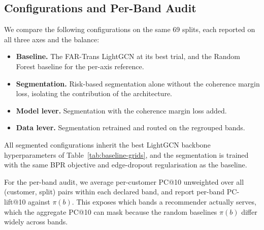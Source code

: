 \subsection{Configurations and Per-Band Audit}
\label{sec:exp:ablation}
We compare the following configurations on the same 69 splits, each reported on all three axes and the balance:
\begin{itemize}
    \item \textbf{Baseline.} The FAR-Trans LightGCN at its best trial, and the Random Forest baseline for the per-axis reference.
    \item \textbf{Segmentation.} Risk-based segmentation alone without the coherence margin loss, isolating the contribution of the architecture.
    \item \textbf{Model lever.} Segmentation with the coherence margin loss added.
    \item \textbf{Data lever.} Segmentation retrained and routed on the regrouped bands.
\end{itemize}
All segmented configurations inherit the best LightGCN backbone hyperparameters of Table~\ref{tab:baseline-grids}, and the segmentation is trained with the same BPR objective and edge-dropout regularisation as the baseline.

For the per-band audit, we average per-customer PC@10 unweighted over all (customer, split) pairs within each declared band, and report per-band PC-lift@10 against $\pi(b)$. This exposes which bands a recommender actually serves, which the aggregate PC@10 can mask because the random baselines $\pi(b)$ differ widely across bands.
